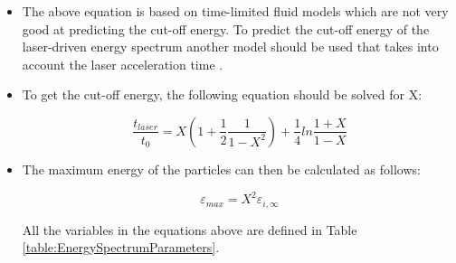   \begin{itemize}
  \item The above equation is based on time-limited fluid models which are not very good at predicting the cut-off energy. To predict
  the cut-off energy of the laser-driven energy spectrum another model should be used that takes into account the laser 
  acceleration time \cite{10.1103/PhysRevLett.97.045005}.
  
  \item To get the cut-off energy, the following equation should be solved for X:

  \begin{equation}
    \frac{t_{laser}}{t_{0}} = X(1 + \frac{1}{2} \frac{1}{1 - X^{2}}) + \frac{1}{4} ln\frac{1+X}{1-X} 
    \label{eq:Eq:Spct:1}
  \end{equation}
      
  \item The maximum energy of the particles can then be calculated as follows:

    \begin{equation}
      \varepsilon_{max} = X^{2} \varepsilon_{i,\infty}
      \label{eq:Eq:Spct:2}
    \end{equation}

    All the variables in the equations above are defined in Table \ref{table:EnergySpectrumParameters}.
    

\end{itemize}
